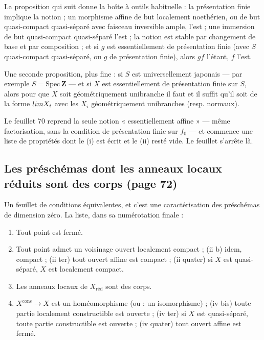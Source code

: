 \documentclass[11pt,a4paper]{article}
\begin{document}
La proposition qui suit donne la boîte à outils habituelle : la présentation
finie implique la notion ; un morphisme affine de but localement noethérien, ou
de but quasi-compact quasi-séparé avec faisceau inversible ample, l'est ; une
immersion de but quasi-compact quasi-séparé l'est ; la notion est stable par
changement de base et par composition ; et si $g$ est essentiellement de
présentation finie (avec $S$ quasi-compact quasi-séparé, ou $g$ de présentation
finie), alors $gf$ l'étant, $f$ l'est.

Une seconde proposition, plus fine : si $S$ est universellement japonais — par
exemple $S = \mathrm{Spec}\,\mathbf{Z}$ — et si $X$ est essentiellement de
présentation finie sur $S$, alors pour que $X$ soit géométriquement unibranche
il faut et il suffit qu'il soit de la forme $\varprojlim X_{i}$ avec les $X_{i}$
géométriquement unibranches (resp. normaux).

Le feuillet 70 reprend la seule notion « essentiellement affine » — même
factorisation, sans la condition de présentation finie sur $f_{0}$ — et
commence une liste de propriétés dont le (i) est écrit et le (ii) resté vide.
Le feuillet s'arrête là.

\subsection*{Les préschémas dont les anneaux locaux réduits sont des corps (page 72)}

Un feuillet de conditions équivalentes, et c'est une caractérisation des
préschémas de dimension zéro. La liste, dans sa numérotation finale :

\begin{enumerate}
  \item[(i)] Tout point est fermé.
  \item[(ii)] Tout point admet un voisinage ouvert localement compact ; (ii b)
  idem, compact ; (ii ter) tout ouvert affine est compact ; (ii quater) si $X$
  est quasi-séparé, $X$ est localement compact.
  \item[(iii)] Les anneaux locaux de $X_{\mathrm{réd}}$ sont des corps.
  \item[(iv)] $X^{\mathrm{cons}} \to X$ est un homéomorphisme (ou : un
  isomorphisme) ; (iv bis) toute partie localement constructible est ouverte ;
  (iv ter) si $X$ est quasi-séparé, toute partie constructible est ouverte ;
  (iv quater) tout ouvert affine est fermé.
\end{enumerate}
\end{document}
